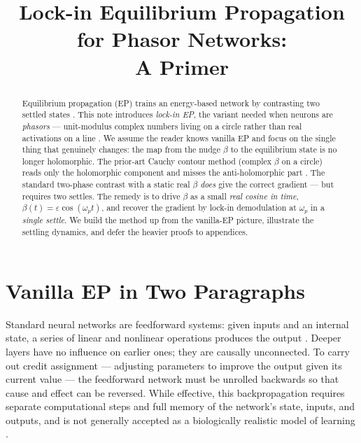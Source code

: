 \documentclass[11pt]{article}
\title{Lock-in Equilibrium Propagation for Phasor Networks:\\
A Primer}
\author{}
\date{}
\begin{document}
\maketitle


\begin{abstract}
Equilibrium propagation (EP) trains an energy-based network by contrasting two settled states \citep{scellier2017equilibrium}. This note introduces \emph{lock-in EP}, the variant needed when neurons are \emph{phasors} --- unit-modulus complex numbers living on a circle rather than real activations on a line \citep{olin2021deep}. We assume the reader knows vanilla EP and focus on the single thing that genuinely changes: the map from the nudge $\beta$ to the equilibrium state is no longer holomorphic. The prior-art Cauchy contour method (complex $\beta$ on a circle) reads only the holomorphic component and misses the anti-holomorphic part \citep{laborieux2022holomorphic}. The standard two-phase contrast with a static real $\beta$ \emph{does} give the correct gradient --- but requires two settles. The remedy is to drive $\beta$ as a small \emph{real cosine in time}, $\beta(t)=\varepsilon\cos(\omega_p t)$, and recover the gradient by lock-in demodulation at $\omega_p$ in a \emph{single settle}. We build the method up from the vanilla-EP picture, illustrate the settling dynamics, and defer the heavier proofs to appendices.
\end{abstract}

\section{Vanilla EP in Two Paragraphs}\label{sec:vanilla}

Standard neural networks are feedforward systems: given inputs and an internal state, a series of linear and nonlinear operations produces the output \citep{rumelhart1986learning}. Deeper layers have no influence on earlier ones; they are causally unconnected. To carry out credit assignment --- adjusting parameters to improve the output given its current value --- the feedforward network must be unrolled backwards so that cause and effect can be reversed. While effective, this backpropagation requires separate computational steps and full memory of the network's state, inputs, and outputs, and is not generally accepted as a biologically realistic model of learning \citep{ororbia2023brain}.
\end{document}
